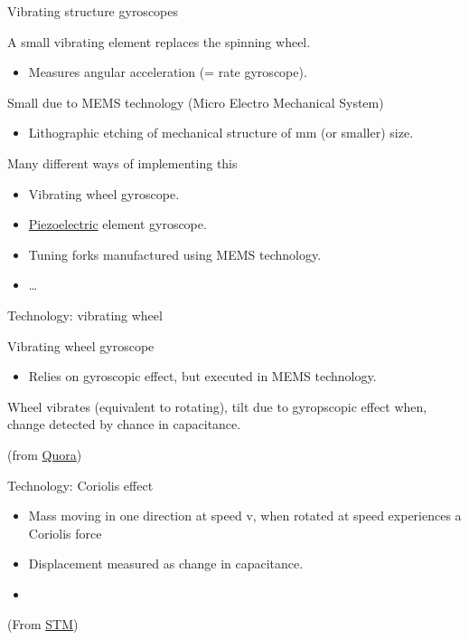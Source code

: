 \documentclass[compress]{beamer}
\providecommand{\tightlist}{%
  \setlength{\itemsep}{0pt}\setlength{\parskip}{0pt}}
\begin{document}
\begin{frame}{Vibrating structure gyroscopes}

A small vibrating element replaces the spinning wheel.

\begin{itemize}
\tightlist
\item
  Measures angular acceleration (= rate gyroscope).
\end{itemize}

Small due to MEMS technology (Micro Electro Mechanical System)

\begin{itemize}
\tightlist
\item
  Lithographic etching of mechanical structure of mm (or smaller) size.
\end{itemize}

Many different ways of implementing this

\begin{itemize}
\tightlist
\item
  Vibrating wheel gyroscope.
\item
  \href{http://en.wikipedia.org/wiki/Piezoelectric_effect}{Piezoelectric}
  element gyroscope.
\item
  Tuning forks manufactured using MEMS technology.
\item
  \ldots{}
\end{itemize}

\end{frame}

\begin{frame}{Technology: vibrating wheel}

Vibrating wheel gyroscope

\begin{itemize}
\tightlist
\item
  Relies on gyroscopic effect, but executed in MEMS technology.
\end{itemize}

Wheel vibrates (equivalent to rotating), tilt due to gyropscopic effect
when, change detected by chance in capacitance.

(from
\href{https://www.quora.com/How-does-a-MEMS-gyroscope-work}{Quora})

\end{frame}

\begin{frame}{Technology: Coriolis effect}

\begin{itemize}
\tightlist
\item
  Mass moving in one direction at speed v, when rotated at speed
  experiences a Coriolis force
\item
  Displacement measured as change in capacitance.
\end{itemize}

\begin{itemize}
\tightlist
\item
  ~
\end{itemize}

(From
\href{http://electroiq.com/blog/2010/11/introduction-to-mems-gyroscopes/}{STM})

\end{frame}
\end{document}
